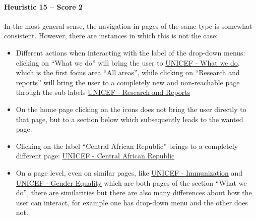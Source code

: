 \paragraph*{Heuristic 15 – Score 2}
In the most general sense, the navigation in pages of the same type is somewhat consistent. However, there are instances in which this is not the case:
\begin{itemize}
	\item Different actions when interacting with the label of the drop-down menus: clicking on “What we do” will bring the user to \href{https://www.unicef.org/what-we-do}{UNICEF - What we do}, which is the first focus area “All areas”, while clicking on “Research and reports” will bring the user to a completely new and non-reachable page through the sub labels \href{https://www.unicef.org/research-and-reports}{UNICEF - Research and Reports}
	\item On the home page clicking on the icons does not bring the user directly to that page, but to a section below which subsequently leads to the wanted page.
	\item Clicking on the label “Central African Republic” brings to a completely different page: \href{https://www.unicef.org/car/en}{UNICEF - Central African Republic}
	\item On a page level, even on similar pages, like \href{https://www.unicef.org/immunization}{UNICEF - Immunization} and \href{https://www.unicef.org/gender-equality}{UNICEF - Gender Equality} which are both pages of the section “What we do”, there are similarities but there are also many differences about how the user can interact, for example one has drop-down menu and the other does not.
\end{itemize}

